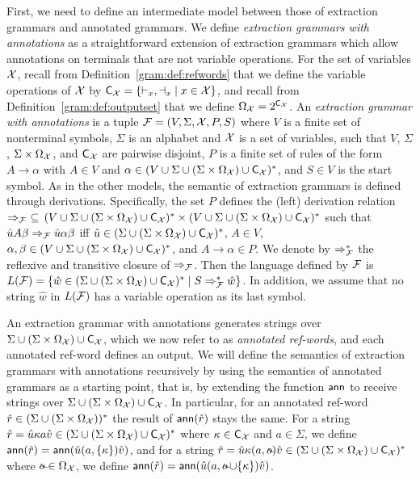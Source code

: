 First, we need to define an intermediate model between those of extraction grammars and annotated grammars. 
We define \emph{extraction grammars with annotations} as a straightforward
extension of extraction grammars which allow annotations on terminals that are
not variable operations. 
For the set of variables $\mathcal{X}$, recall from Definition~\ref{gram:def:refwords} that
we define the variable operations  of $\mathcal{X}$ by $\textsf{C}_{\mathcal{X}} = \{ {\vdash_x},
{\dashv_x} \mid x\in \mathcal{X}\}$,
and recall from Definition~\ref{gram:def:outputset} that we define $\Omega_{\mathcal{X}} = 2^{\textsf{C}_{\mathcal{X}}}$. An \emph{extraction grammar with annotations} is a tuple
$\mathcal{F} = (V, \Sigma, \mathcal{X}, P, S)$ where 
$V$ is a finite set of nonterminal symbols, $\Sigma$ is an alphabet and $\mathcal{X}$ is a set of variables, such that $V$, $\Sigma$, $\Sigma\times\Omega_{\mathcal{X}}$, and $\textsf{C}_{\mathcal{X}}$ are pairwise disjoint, 
$P$ is a finite set of rules of the form $A \to \alpha$ with $A \in
V$ and $\alpha \in (V \cup \Sigma \cup (\Sigma\times\Omega_{\mathcal{X}}) \cup \textsf{C}_{\mathcal{X}})^*$, and $S \in V$ is the
start symbol. As in the other models, the semantic of extraction grammars is defined through derivations. Specifically,  the set $P$ defines the (left) derivation relation $\Rightarrow_{\mathcal{F}} \ \subseteq \, (V \cup \Sigma  \cup (\Sigma\times\Omega_{\mathcal{X}}) \cup \textsf{C}_{\mathcal{X}})^* \times (V \cup \Sigma  \cup (\Sigma\times\Omega_{\mathcal{X}}) \cup  \textsf{C}_{\mathcal{X}})^*$ such that $\hat{u} A \beta \Rightarrow_{\mathcal{F}} \hat{u} \alpha \beta$ iff $\hat{u} \in (\Sigma  \cup (\Sigma\times\Omega_{\mathcal{X}}) \cup \textsf{C}_{\mathcal{X}})^*$, $A \in V$, $\alpha, \beta \in (V \cup \Sigma \cup (\Sigma\times\Omega_{\mathcal{X}}) \cup \textsf{C}_{\mathcal{X}})^*$, and $A \rightarrow \alpha \in P$. We denote by $\Rightarrow_{\mathcal{F}}^*$ the reflexive and transitive closure of $\Rightarrow_{\mathcal{F}}$. Then the language defined by $\mathcal{F}$ is $L(\mathcal{F}) = \{\hat{w} \in (\Sigma \cup (\Sigma\times\Omega_{\mathcal{X}}) \cup \textsf{C}_{\mathcal{X}})^* \mid S \Rightarrow_{\mathcal{F}}^* \hat{w}\}$. In addition, we assume that no string $\hat{w}$ in $L(\mathcal{F})$ has a variable operation as its last symbol.

An extraction grammar with annotations generates
strings over $\Sigma \cup (\Sigma\times\Omega_{\mathcal{X}}) \cup \textsf{C}_{\mathcal{X}}$, which we now refer to as \emph{annotated ref-words}, and each annotated ref-word defines an output.
We will define the semantics of extraction grammars with annotations recursively by using the semantics of annotated grammars as a starting point, that is, by extending the function $\textsf{ann}$ to receive strings over $\Sigma \cup (\Sigma\times\Omega_{\mathcal{X}}) \cup \textsf{C}_{\mathcal{X}}$. In particular, for an annotated ref-word $\hat{r}\in (\Sigma \cup (\Sigma\times\Omega_{\mathcal{X}}))^*$ the result of $\textsf{ann}(\hat{r})$ stays the same. For a string $\hat{r} = \hat{u} \kappa a \hat{v} \in (\Sigma \cup (\Sigma\times\Omega_{\mathcal{X}}) \cup \textsf{C}_{\mathcal{X}})^*$ where $\kappa\in \textsf{C}_{\mathcal{X}}$ and $a\in\Sigma$, we define $\textsf{ann}(\hat{r}) = \textsf{ann}(\hat{u} (a,\{\kappa\}) \hat{v})$, and for a string $\hat{r} = \hat{u} \kappa (a,\oout) \hat{v} \in (\Sigma \cup (\Sigma\times\Omega_\var) \cup \captures_\var)^*$ where $\oout\in\Omega_\var$, we define $\ann(\hat{r}) = \ann(\hat{u} (a,\oout\cup\{\kappa\}) \hat{v})$.

